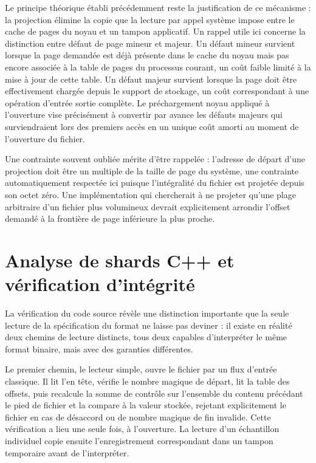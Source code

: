 \documentclass[12pt,a4paper]{report}
\begin{document}
Le principe théorique établi précédemment reste la justification de ce mécanisme : la projection élimine la copie que la lecture par appel système impose entre le cache de pages du noyau et un tampon applicatif. Un rappel utile ici concerne la distinction entre défaut de page mineur et majeur. Un défaut mineur survient lorsque la page demandée est déjà présente dans le cache du noyau mais pas encore associée à la table de pages du processus courant, un coût faible limité à la mise à jour de cette table. Un défaut majeur survient lorsque la page doit être effectivement chargée depuis le support de stockage, un coût correspondant à une opération d'entrée sortie complète. Le préchargement noyau appliqué à l'ouverture vise précisément à convertir par avance les défauts majeurs qui surviendraient lors des premiers accès en un unique coût amorti au moment de l'ouverture du fichier.

Une contrainte souvent oubliée mérite d'être rappelée : l'adresse de départ d'une projection doit être un multiple de la taille de page du système, une contrainte automatiquement respectée ici puisque l'intégralité du fichier est projetée depuis son octet zéro. Une implémentation qui chercherait à ne projeter qu'une plage arbitraire d'un fichier plus volumineux devrait explicitement arrondir l'offset demandé à la frontière de page inférieure la plus proche.

\section{Analyse de shards C++ et vérification d'intégrité}
\label{sec:parseur_cpp}

La vérification du code source révèle une distinction importante que la seule lecture de la spécification du format ne laisse pas deviner : il existe en réalité deux chemins de lecture distincts, tous deux capables d'interpréter le même format binaire, mais avec des garanties différentes.

Le premier chemin, le lecteur simple, ouvre le fichier par un flux d'entrée classique. Il lit l'en tête, vérifie le nombre magique de départ, lit la table des offsets, puis recalcule la somme de contrôle sur l'ensemble du contenu précédant le pied de fichier et la compare à la valeur stockée, rejetant explicitement le fichier en cas de désaccord ou de nombre magique de fin invalide. Cette vérification a lieu une seule fois, à l'ouverture. La lecture d'un échantillon individuel copie ensuite l'enregistrement correspondant dans un tampon temporaire avant de l'interpréter.
\end{document}
